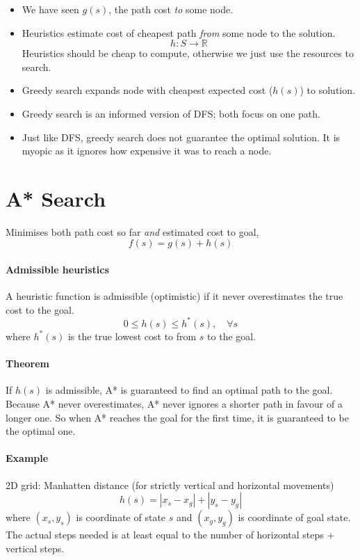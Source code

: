 \documentclass[12pt, a4paper]{article}
\begin{document}
\begin{itemize}
    \item We have seen $g(s)$, the path cost \textit{to} some node.
    \item Heuristics estimate cost of cheapest path \textit{from} some node to the solution.
    \[h: S\rightarrow \mathbb{R}\]
    Heuristics should be cheap to compute, otherwise we just use the resources to search.
    \item Greedy search expands node with cheapest expected cost ($h(s)$) to solution.
    \item Greedy search is an informed version of DFS; both focus on one path.
    \item Just like DFS, greedy search does not guarantee the optimal solution. 
    It is myopic as it ignores how expensive it was to reach a node.
\end{itemize}

\newpage

\section{A* Search}
Minimises both path cost so far \textit{and} estimated cost to goal,
\[f(s) = g(s) + h(s)\]

\paragraph{Admissible heuristics} A heuristic function is admissible (optimistic) if
it never overestimates the true cost to the goal.
\[0\leq h(s) \leq h^*(s), \quad \forall s\]
where $h^*(s)$ is the true lowest cost to from $s$ to the goal.

\paragraph{Theorem} If $h(s)$ is admissible, A* is guaranteed to find an optimal path to the goal.\newline 
Because A* never overestimates, A* never ignores a shorter path in favour of a longer one. 
So when A* reaches the goal for the first time, it is guaranteed to be the optimal one.


\paragraph{Example} 2D grid: Manhatten distance (for strictly vertical and horizontal movements)
\[h(s) = |x_s - x_g| + |y_s - y_g|\]
where $(x_s, y_s)$ is coordinate of state $s$ and $(x_g, y_g)$ is coordinate of goal state.\newline
The actual steps needed is at least equal to the number of horizontal steps + vertical steps.
\end{document}
